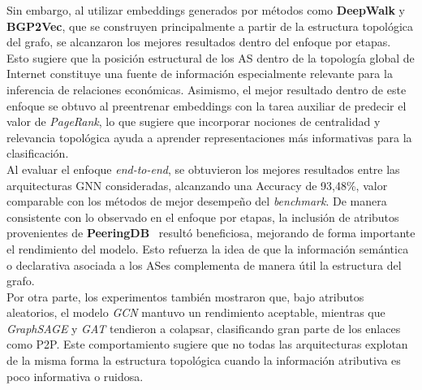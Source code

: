 Sin embargo, al utilizar embeddings generados por métodos como \textbf{DeepWalk} y \textbf{BGP2Vec}, que se construyen principalmente a partir de la estructura topológica del grafo, se alcanzaron los mejores resultados dentro del enfoque por etapas. Esto sugiere que la posición estructural de los AS dentro de la topología global de Internet constituye una fuente de información especialmente relevante para la inferencia de relaciones económicas. Asimismo, el mejor resultado dentro de este enfoque se obtuvo al preentrenar embeddings con la tarea auxiliar de predecir el valor de \textit{PageRank}, lo que sugiere que incorporar nociones de centralidad y relevancia topológica ayuda a aprender representaciones más informativas para la clasificación.\\




Al evaluar el enfoque \textit{end-to-end}, se obtuvieron los mejores resultados entre las arquitecturas GNN consideradas, alcanzando una Accuracy de 93,48\%, valor comparable con los métodos de mejor desempeño del \textit{benchmark}. De manera consistente con lo observado en el enfoque por etapas, la inclusión de atributos provenientes de \textbf{PeeringDB}~\cite{PeeringDB} resultó beneficiosa, mejorando de forma importante el rendimiento del modelo. Esto refuerza la idea de que la información semántica o declarativa asociada a los ASes complementa de manera útil la estructura del grafo.\\




Por otra parte, los experimentos también mostraron que, bajo atributos aleatorios, el modelo \textit{GCN} mantuvo un rendimiento aceptable, mientras que \textit{GraphSAGE} y \textit{GAT} tendieron a colapsar, clasificando gran parte de los enlaces como P2P. Este comportamiento sugiere que no todas las arquitecturas explotan de la misma forma la estructura topológica cuando la información atributiva es poco informativa o ruidosa.\\


